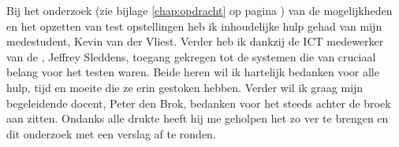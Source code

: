 
Bij het onderzoek (zie bijlage \ref{chap:opdracht} op pagina
\pageref{chap:opdracht}) van de mogelijkheden en het opzetten van test
opstellingen heb ik inhoudelijke hulp gehad van mijn medestudent,
Kevin van der Vliest. Verder heb ik dankzij de ICT medewerker van de
\HR{}, Jeffrey Sleddens, toegang gekregen tot de systemen die van
cruciaal belang voor het testen waren. Beide heren wil ik hartelijk
bedanken voor alle hulp, tijd en moeite die ze erin gestoken
hebben. Verder wil ik graag mijn begeleidende docent, Peter den Brok,
bedanken voor het steeds achter de broek aan zitten. Ondanks alle
drukte heeft hij me geholpen het zo ver te brengen en dit onderzoek
met een verslag af te ronden.


